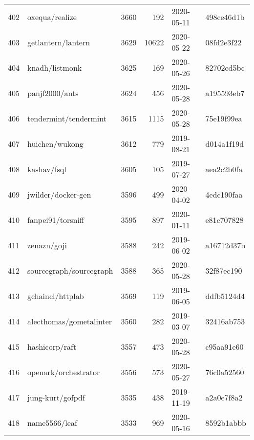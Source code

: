 \begin{footnotesize}
\begin{longtable}{llrrll}
        402 &                                     oxequa/realize &   3660 &    192 & 2020-05-11 &  498ce46d1b \\
        403 &                                 getlantern/lantern &   3629 &  10622 & 2020-05-22 &  08fd2e3f22 \\
        404 &                                     knadh/listmonk &   3625 &    169 & 2020-05-26 &  82702ed5bc \\
        405 &                                     panjf2000/ants &   3624 &    456 & 2020-05-28 &  a195593eb7 \\
        406 &                              tendermint/tendermint &   3615 &   1115 & 2020-05-28 &  75e19f99ea \\
        407 &                                     huichen/wukong &   3612 &    779 & 2019-08-21 &  d014a1f19d \\
        408 &                                        kashav/fsql &   3605 &    105 & 2019-07-27 &  aea2c2b0fa \\
        409 &                                 jwilder/docker-gen &   3596 &    499 & 2020-04-02 &  4edc190faa \\
        410 &                                  fanpei91/torsniff &   3595 &    897 & 2020-01-11 &  e81c707828 \\
        411 &                                        zenazn/goji &   3588 &    242 & 2019-06-02 &  a16712d37b \\
        412 &                            sourcegraph/sourcegraph &   3588 &    365 & 2020-05-28 &  32f87ec190 \\
        413 &                                   gchaincl/httplab &   3569 &    119 & 2019-06-05 &  ddfb5124d4 \\
        414 &                            alecthomas/gometalinter &   3560 &    282 & 2019-03-07 &  32416ab753 \\
        415 &                                     hashicorp/raft &   3557 &    473 & 2020-05-28 &  c95aa91e60 \\
        416 &                               openark/orchestrator &   3556 &    573 & 2020-05-27 &  76c0a52560 \\
        417 &                                   jung-kurt/gofpdf &   3535 &    438 & 2019-11-19 &  a2a0e7f8a2 \\
        418 &                                      name5566/leaf &   3533 &    969 & 2020-05-16 &  8592b1abbb \\

\end{longtable}
\end{footnotesize}
